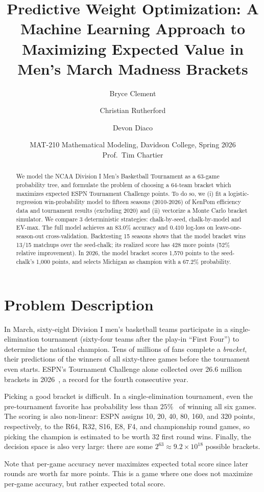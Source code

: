 \documentclass[12pt]{article}
\title{Predictive Weight Optimization: A Machine Learning Approach to Maximizing Expected Value in Men's March Madness Brackets}
\author{Bryce Clement \and Christian Rutherford \and Devon Diaco}
\date{MAT-210 Mathematical Modeling, Davidson College, Spring 2026 \\ Prof.\ Tim Chartier}
\begin{document}
\maketitle

\begin{abstract}
We model the NCAA Division I Men's Basketball Tournament as a 63-game probability tree, and formulate the problem of choosing a 64-team bracket which maximizes expected ESPN Tournament Challenge points. To do so, we (i) fit a logistic-regression win-probability model to fifteen seasons (2010-2026) of KenPom efficiency data and tournament results (excluding 2020) and (ii) vectorize a Monte Carlo bracket simulator. We compare 3 deterministic strategies: chalk-by-seed, chalk-by-model and EV-max. The full model achieves an $83.0\%$ accuracy and $0.410$ log-loss on leave-one-season-out cross-validation. Backtesting 15 seasons shows that the model bracket wins 13/15 matchups over the seed-chalk; its realized score has 428 more points (52\% relative improvement). In 2026, the model bracket scores 1{,}570 points to the seed-chalk's 1{,}000 points, and selects Michigan as champion with a 67.2\% probability.
\end{abstract}

\section{Problem Description}

In March, sixty-eight Division I men's basketball teams participate in a single-elimination tournament (sixty-four teams after the play-in ``First Four'') to determine the national champion. Tens of millions of fans complete a \emph{bracket}, their predictions of the winners of all sixty-three games before the tournament even starts. ESPN's Tournament Challenge alone collected over 26.6 million brackets in 2026~\cite{espn}, a record for the fourth consecutive year.

Picking a good bracket is difficult. In a single-elimination tournament, even the pre-tournament favorite has probability less than $25\%$~\cite{kenpom} of winning all six games. The scoring is also non-linear: ESPN assigns 10, 20, 40, 80, 160, and 320 points, respectively, to the R64, R32, S16, E8, F4, and championship round games, so picking the champion is estimated to be worth 32 first round wins. Finally, the decision space is also very large: there are some $2^{63} \approx 9.2 \times 10^{18}$ possible brackets.

Note that per-game accuracy never maximizes expected total score since later rounds are worth far more points. This is a game where one does not maximize per-game accuracy, but rather expected total score.
\end{document}
